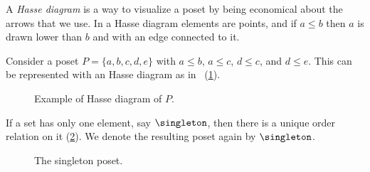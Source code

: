 A \emph{Hasse diagram} is a way to visualize a poset by being economical about the arrows that we use. In a Hasse diagram elements are points, and if $a \leq b$ then $a$ is drawn lower than $b$ and with an edge connected to it. 

\begin{example}
Consider a poset $P=\{a,b,c,d,e\}$ with $a\leq b$, $a\leq c$, $d\leq c$, and $d\leq e$. This can be represented with an Hasse diagram as in ~(\cref{fig:hasse}).
\end{example}

\begin{figure}[h!]
   \centering
   \caption{Example of Hasse diagram of $P$. \label{fig:hasse}}
\end{figure}

\begin{example}\label{ex:singleton}
If a set has only one element, say $\singleton$, then there is a unique order relation on it (\cref{fig:singleton}). We denote the resulting poset again by $\singleton$.
\end{example}
\begin{figure}[h!]
   \centering
   \caption{The singleton poset.\label{fig:singleton}}
\end{figure}


